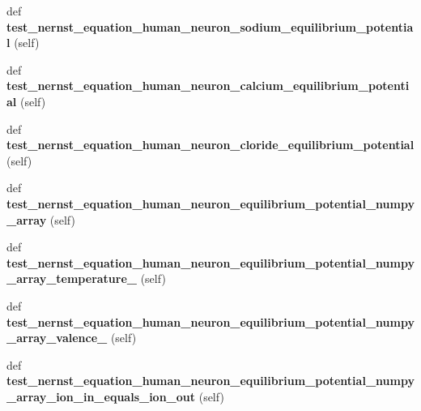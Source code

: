 \begin{DoxyCompactItemize}
\item 
\mbox{\label{classtest__equations_1_1TestNernstEquation_af765d2eb3fd5b01c4b2878acdce0b99b}} 
def {\bfseries test\+\_\+nernst\+\_\+equation\+\_\+human\+\_\+neuron\+\_\+sodium\+\_\+equilibrium\+\_\+potential} (self)
\item 
\mbox{\label{classtest__equations_1_1TestNernstEquation_a9522bab5328c5d8b1ecb3a2489e71add}} 
def {\bfseries test\+\_\+nernst\+\_\+equation\+\_\+human\+\_\+neuron\+\_\+calcium\+\_\+equilibrium\+\_\+potential} (self)
\item 
\mbox{\label{classtest__equations_1_1TestNernstEquation_a186f8df2339b9d2b0bb0a19a507b0ffc}} 
def {\bfseries test\+\_\+nernst\+\_\+equation\+\_\+human\+\_\+neuron\+\_\+cloride\+\_\+equilibrium\+\_\+potential} (self)
\item 
\mbox{\label{classtest__equations_1_1TestNernstEquation_a1be5da409b4aebf278150b0026b6b73c}} 
def {\bfseries test\+\_\+nernst\+\_\+equation\+\_\+human\+\_\+neuron\+\_\+equilibrium\+\_\+potential\+\_\+numpy\+\_\+array} (self)
\item 
\mbox{\label{classtest__equations_1_1TestNernstEquation_a2f4d0cfe7c244efa82816c6efb82a54b}} 
def {\bfseries test\+\_\+nernst\+\_\+equation\+\_\+human\+\_\+neuron\+\_\+equilibrium\+\_\+potential\+\_\+numpy\+\_\+array\+\_\+temperature\+\_} (self)
\item 
\mbox{\label{classtest__equations_1_1TestNernstEquation_a0093c05c7505a0581704e6210c3bb886}} 
def {\bfseries test\+\_\+nernst\+\_\+equation\+\_\+human\+\_\+neuron\+\_\+equilibrium\+\_\+potential\+\_\+numpy\+\_\+array\+\_\+valence\+\_} (self)
\item 
\mbox{\label{classtest__equations_1_1TestNernstEquation_a4b47d3d70e2db56c1e19597ffa696302}} 
def {\bfseries test\+\_\+nernst\+\_\+equation\+\_\+human\+\_\+neuron\+\_\+equilibrium\+\_\+potential\+\_\+numpy\+\_\+array\+\_\+ion\+\_\+in\+\_\+equals\+\_\+ion\+\_\+out} (self)
\item 

\end{DoxyCompactItemize}
